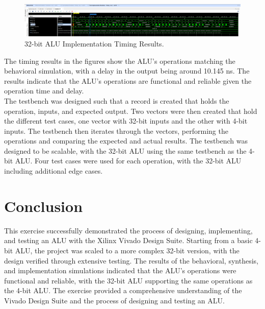 \documentclass[CMPE]{KGCOEReport}
\begin{document}
\begin{figure}[H]
    \centering
    \includegraphics[width=1\textwidth]{implement2.png}
    \caption{32-bit ALU Implementation Timing Results.}
    \label{fig:32bit_implementation}
\end{figure}

The timing results in the figures show the ALU's operations matching the behavioral simulation, with a delay in the output being around 10.145 ns. The results indicate that the ALU's operations are functional and reliable given the operation time and delay.\\

The testbench was designed such that a record is created that holds the operation, inputs, and expected output. Two vectors were then created that hold the different test cases, one vector with 32-bit inputs and the other with 4-bit inputs. The testbench then iterates through the vectors, performing the operations and comparing the expected and actual results. The testbench was designed to be scalable, with the 32-bit ALU using the same testbench as the 4-bit ALU. Four test cases were used for each operation, with the 32-bit ALU including additional edge cases.

\section*{Conclusion}

This exercise successfully demonstrated the process of designing, implementing, and testing an ALU with the Xilinx Vivado Design Suite. Starting from a basic 4-bit ALU, the project was scaled to a more complex 32-bit version, with the design verified through extensive testing. The results of the behavioral, synthesis, and implementation simulations indicated that the ALU's operations were functional and reliable, with the 32-bit ALU supporting the same operations as the 4-bit ALU. The exercise provided a comprehensive understanding of the Vivado Design Suite and the process of designing and testing an ALU.
\end{document}
